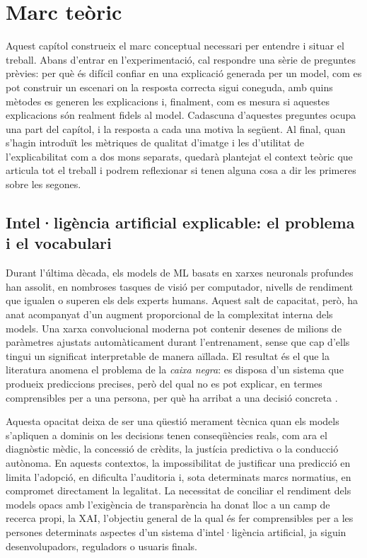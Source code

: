 
\chapter{Marc teòric}\label{teoria}

Aquest capítol construeix el marc conceptual necessari per entendre i situar el treball. Abans d'entrar en l'experimentació, cal respondre una sèrie de preguntes prèvies: per què és difícil confiar en una explicació generada per un model, com es pot construir un escenari on la resposta correcta sigui coneguda, amb quins mètodes es generen les explicacions i, finalment, com es mesura si aquestes explicacions són realment fidels al model. Cadascuna d'aquestes preguntes ocupa una part del capítol, i la resposta a cada una motiva la següent. Al final, quan s'hagin introduït les mètriques de qualitat d'imatge i les d'utilitat de l'explicabilitat com a dos mons separats, quedarà plantejat el context teòric que articula tot el treball i podrem reflexionar si tenen alguna cosa a dir les primeres sobre les segones.

\section{Intel·ligència artificial explicable: el problema i el vocabulari}
Durant l'última dècada, els models de \ac{ML} basats en xarxes neuronals profundes han assolit, en nombroses tasques de visió per computador, nivells de rendiment que igualen o superen els dels experts humans. Aquest salt de capacitat, però, ha anat acompanyat d'un augment proporcional de la complexitat interna dels models. Una xarxa convolucional moderna pot contenir desenes de milions de paràmetres ajustats automàticament durant l'entrenament, sense que cap d'ells tingui un significat interpretable de manera aïllada. El resultat és el que la literatura anomena el problema de la \emph{caixa negra}: es disposa d'un sistema que produeix prediccions precises, però del qual no es pot explicar, en termes comprensibles per a una persona, per què ha arribat a una decisió concreta \cite{Adadi2018}.

Aquesta opacitat deixa de ser una qüestió merament tècnica quan els models s'apliquen a dominis on les decisions tenen conseqüències reals, com ara el diagnòstic mèdic, la concessió de crèdits, la justícia predictiva o la conducció autònoma. En aquests contextos, la impossibilitat de justificar una predicció en limita l'adopció, en dificulta l'auditoria i, sota determinats marcs normatius, en compromet directament la legalitat. La necessitat de conciliar el rendiment dels models opacs amb l'exigència de transparència ha donat lloc a un camp de recerca propi, la \ac{XAI}, l'objectiu general de la qual és fer comprensibles per a les persones determinats aspectes d'un sistema d'intel·ligència artificial, ja siguin desenvolupadors, reguladors o usuaris finals.

